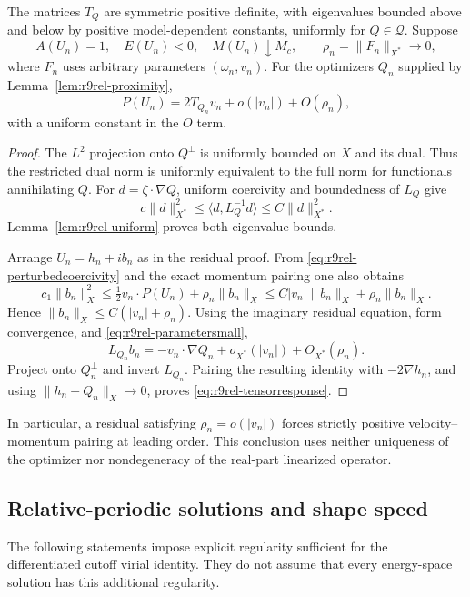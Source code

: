 \begin{proposition}\label{prop:r9rel-tensor}
The matrices $T_Q$ are symmetric positive definite, with eigenvalues
bounded above and below by positive model-dependent constants,
uniformly for $Q\in\mathcal Q$.
Suppose
\[
 A(U_n)=1,\quad E(U_n)<0,\quad M(U_n)\downarrow M_c,
 \qquad \rho_n=\|F_n\|_{X^*}\longrightarrow0,
\]
where $F_n$ uses arbitrary parameters $(\omega_n,v_n)$.
For the optimizers $Q_n$ supplied by
Lemma~\ref{lem:r9rel-proximity},
\begin{equation}\label{eq:r9rel-tensorresponse}
 P(U_n)=2T_{Q_n}v_n+o(|v_n|)+O(\rho_n),
\end{equation}
with a uniform constant in the $O$ term.
\end{proposition}
\begin{proof}
The $L^2$ projection onto $Q^\perp$ is uniformly bounded on $X$
and its dual. Thus the restricted dual norm is uniformly equivalent
to the full norm for functionals annihilating $Q$.
For $d=\zeta\cdot\nabla Q$, uniform coercivity and boundedness of
$L_Q$ give
\[
 c\|d\|_{X^*}^2\le\langle d,L_Q^{-1}d\rangle
 \le C\|d\|_{X^*}^2.
\]
Lemma~\ref{lem:r9rel-uniform} proves both eigenvalue bounds.

Arrange $U_n=h_n+ib_n$ as in the residual proof.
From \eqref{eq:r9rel-perturbedcoercivity} and the exact momentum
pairing one also obtains
\[
 c_1\|b_n\|_X^2
 \le\tfrac12v_n\cdot P(U_n)+\rho_n\|b_n\|_X
 \le C|v_n|\|b_n\|_X+\rho_n\|b_n\|_X.
\]
Hence $\|b_n\|_X\le C(|v_n|+\rho_n)$.
Using the imaginary residual equation, form convergence, and
\eqref{eq:r9rel-parametersmall},
\[
 L_{Q_n}b_n=-v_n\cdot\nabla Q_n
 +o_{X^*}(|v_n|)+O_{X^*}(\rho_n).
\]
Project onto $Q_n^\perp$ and invert $L_{Q_n}$.
Pairing the resulting identity with $-2\nabla h_n$, and using
$\|h_n-Q_n\|_X\to0$, proves
\eqref{eq:r9rel-tensorresponse}.
\end{proof}

In particular, a residual satisfying $\rho_n=o(|v_n|)$ forces
strictly positive velocity--momentum pairing at leading order.
This conclusion uses neither uniqueness of the optimizer nor
nondegeneracy of the real-part linearized operator.

\subsection{Relative-periodic solutions and shape speed}

The following statements impose explicit regularity sufficient for
the differentiated cutoff virial identity. They do not assume that
every energy-space solution has this additional regularity.

